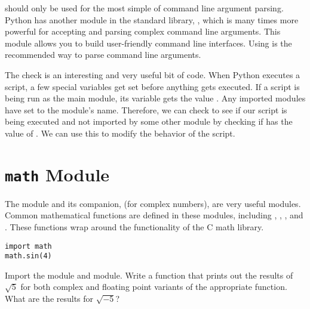 \begin{info}
 should only be used for the most simple of command line argument parsing.
Python has another module in the standard library, , which is many times more powerful for accepting and parsing complex command line arguments.  This module allows you to build user-friendly command line interfaces.  Using  is the recommended way to parse command line arguments.
\end{info}

The check  is an interesting and very useful bit of code.
When Python executes a script, a few special variables get set before anything gets executed.
If a script is being run as the main module, its  variable gets the value .  Any imported modules have  set to the module's name.
Therefore, we can check to see if our script is being executed and not imported by some other module by checking if  has the value of .  We can use this to modify the behavior of the script.

\section*{\texttt{math} Module}
The  module and its companion,  (for complex numbers), are very useful modules.
Common mathematical functions are defined in these modules, including , , , and .
These functions wrap around the functionality of the C math library.
\begin{lstlisting}
import math
math.sin(4)
\end{lstlisting}

\begin{problem}
Import the  module and  module. Write a function that prints out the results of $\sqrt{5}$ for both complex and floating point variants of the appropriate function.  What are the results for $\sqrt{-5}$?
\end{problem}


